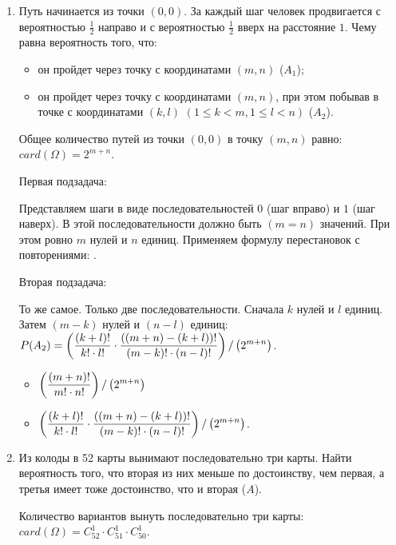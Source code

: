 \documentclass{article}
\begin{document}
\begin{enumerate}
    \item Путь начинается из точки $(0, 0)$. За каждый шаг человек продвигается с вероятностью $\frac{1}{2}$ направо и с вероятностью $\frac{1}{2}$ вверх на расстояние $1$. Чему равна вероятность того, что:
    \begin{itemize}
        \item он пройдет через точку с координатами $(m, n)$ ($A_1$);
        \item он пройдет через точку с координатами $(m, n)$, при этом побывав в точке с координатами $(k, l)$ $(1 \leq k < m, 1 \leq l < n)$ ($A_2$).
    \end{itemize}

    \solution{}

    Общее количество путей из точки $(0, 0)$ в точку $(m, n)$ равно: $card(\Omega) = 2^{m + n}$.

    Первая подзадача:

    Представляем шаги в виде последовательностей $0$ (шаг вправо) и $1$ (шаг наверх). В этой последовательности должно быть $(m = n)$ значений. При этом ровно $m$ нулей и $n$ единиц. Применяем формулу перестановок с повторениями: .

    Вторая подзадача:

    То же самое. Только две последовательности. Сначала $k$ нулей и $l$ единиц. Затем $(m - k)$ нулей и $(n - l)$ единиц: $\displaystyle{P(A_2) = \left( \frac{(k + l)!}{k! \cdot l!} \cdot \frac{((m+n) - (k + l))!}{(m - k)! \cdot (n - l)!}\right) / \left( 2 ^ {m + n}\right)}$.

    \answer{}

    \begin{itemize}
        \item $\displaystyle{\left( \frac{(m + n)!}{m! \cdot n!}\right) / \left( 2 ^ {m + n}\right)}$
        \item $\displaystyle{\left( \frac{(k + l)!}{k! \cdot l!} \cdot \frac{((m+n) - (k + l))!}{(m - k)! \cdot (n - l)!}\right) / \left( 2 ^ {m + n}\right)}$.
    \end{itemize}

    \item Из колоды в 52 карты вынимают последовательно три карты. Найти вероятность того, что вторая из них меньше по достоинству, чем первая, а третья имеет тоже достоинство, что и вторая ($A$).

    \solution{}

    Количество вариантов вынуть последовательно три карты: $card(\Omega) = C_{52}^1 \cdot C_{51}^1 \cdot C_{50}^1$.


\end{enumerate}
\end{document}
